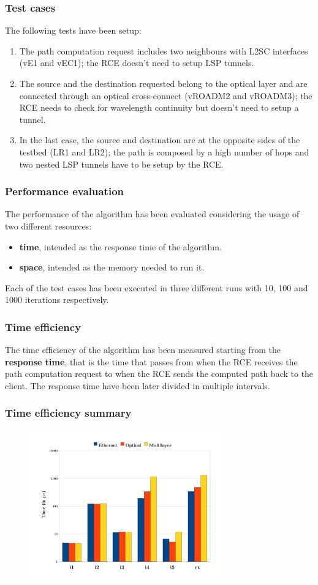 \documentclass{beamer}
\begin{document}
\frame
{
  \frametitle{Test cases}

  The following tests have been setup:

  \begin{enumerate}
  \item<1-> The path computation request includes two neighbours with L2SC
    interfaces (vE1 and vEC1); the RCE doesn't need to setup LSP
    tunnels.
  \item<2-> The source and the destination requested belong to the optical
    layer and are connected through an optical cross-connect (vROADM2
    and vROADM3); the RCE needs to check for wavelength continuity but
    doesn't need to setup a tunnel.
  \item<3-> In the last case, the source and destination are at the
    opposite sides of the testbed (LR1 and LR2); the path is composed
    by a high number of hops and two nested LSP tunnels have to be
    setup by the RCE.
  \end{enumerate}
}
\frame
{
  \frametitle{Performance evaluation}

  The performance of the algorithm has been evaluated considering the
  usage of two different resources:

  \begin{itemize}
  \item \textbf{time}, intended as the response time of
    the algorithm.
  \item \textbf{space}, intended as the memory needed to run it.
  \end{itemize}

  Each of the test cases has been executed in three different runs
  with 10, 100 and 1000 iterations respectively.

}
\frame
{
  \frametitle{Time efficiency}

  The time efficiency of the algorithm has been measured starting from
  the \textbf{response time}, that is the time that passes from when
  the RCE receives the path computation request to when the RCE sends
  the computed path back to the client. The response time have been
  later divided in multiple intervals.

}
\frame
{
  \frametitle{Time efficiency summary}
  
  \begin{figure}[!htbp]
    \begin{center}
      \includegraphics[width=0.75\textwidth]{img/time_graph}
    \end{center}
  \end{figure}
}
\end{document}

